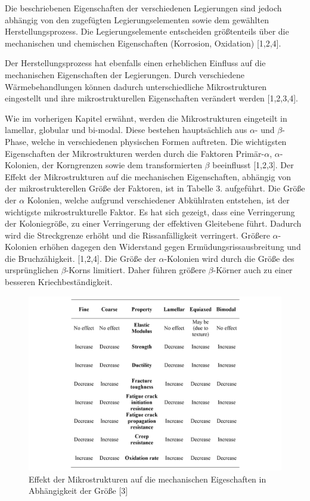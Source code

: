 Die beschriebenen Eigenschaften der verschiedenen Legierungen sind jedoch abhängig von den zugefügten Legierungselementen sowie dem gewählten Herstellungsprozess.
 Die Legierungselemente entscheiden größtenteils über die mechanischen und chemischen Eigenschaften (Korrosion, Oxidation) [1,2,4].

Der Herstellungsprozess hat ebenfalls einen erheblichen Einfluss auf die mechanischen Eigenschaften der Legierungen. Durch verschiedene Wärmebehandlungen können dadurch unterschiedliche Mikrostrukturen eingestellt und ihre mikrostrukturellen Eigenschaften verändert werden [1,2,3,4].

Wie im vorherigen Kapitel erwähnt, werden die Mikrostrukturen eingeteilt in lamellar, globular und bi-modal. Diese bestehen hauptsächlich aus $\alpha$- und $\beta$-Phase, welche in verschiedenen physischen Formen auftreten. Die wichtigsten Eigenschaften der Mikrostrukturen werden durch die Faktoren Primär-$\alpha$, $\alpha$-Kolonien, der Korngrenzen sowie dem transformierten $\beta$ beeinflusst [1,2,3]. Der Effekt der Mikrostrukturen auf die mechanischen Eigenschaften, abhängig von der mikrostrukterellen Größe der Faktoren, ist in Tabelle 3. aufgeführt. Die Größe der $\alpha$ Kolonien, welche aufgrund verschiedener Abkühlraten entstehen, ist der wichtigste mikrostrukturelle Faktor. Es hat sich gezeigt, dass eine Verringerung der Koloniegröße, zu einer Verringerung der effektiven Gleitebene führt. Dadurch wird die Streckgrenze erhöht und die Rissanfälligkeit verringert. Größere $\alpha$-Kolonien erhöhen dagegen den Widerstand gegen Ermüdungsrissausbreitung und die Bruchzähigkeit. [1,2,4]. Die Größe der $\alpha$-Kolonien wird durch die Größe des ursprünglichen $\beta$-Korns limitiert. Daher führen größere $\beta$-Körner auch zu einer besseren Kriechbeständigkeit.

\begin{figure}[h]
	\centering
	\includegraphics[width=0.9\linewidth]{"Bilder/Tabelle 3"}
	\caption[Tabelle]{Effekt der Mikrostrukturen auf die mechanischen Eigeschaften in Abhängigkeit der Größe [3]}
	\label{fig:tabelle-3}
\end{figure}

